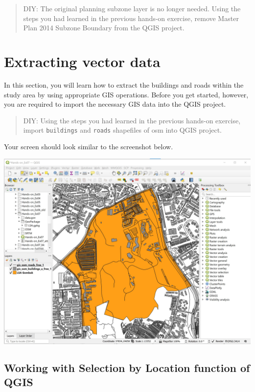 \documentclass[
  letterpaper,
  DIV=11,
  numbers=noendperiod]{scrreprt}
\begin{document}
\begin{quote}
DIY: The original planning subzone layer is no longer needed. Using the
steps you had learned in the previous hands-on exercise, remove Master
Plan 2014 Subzone Boundary from the QGIS project.
\end{quote}

\hypertarget{extracting-vector-data}{%
\section{Extracting vector data}\label{extracting-vector-data}}

In this section, you will learn how to extract the buildings and roads
within the study area by using appropriate GIS operations. Before you
get started, however, you are required to import the necessary GIS data
into the QGIS project.

\begin{quote}
DIY: Using the steps you had learned in the previous hands-on exercise,
import \texttt{buildings} and \texttt{roads} shapefiles of osm into QGIS
project.
\end{quote}

Your screen should look similar to the screenshot below.

\includegraphics{./img07/image9a.jpg}

\hypertarget{working-with-selection-by-location-function-of-qgis}{%
\subsection{Working with Selection by Location function of
QGIS}\label{working-with-selection-by-location-function-of-qgis}}
\end{document}

